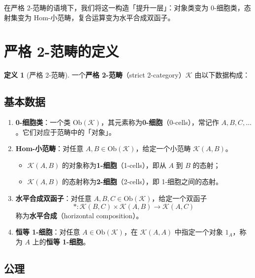 \documentclass[UTF8,a4paper,12pt]{ctexart}
\theoremstyle{definition}
\newtheorem{definition}{定义}[section]
\theoremstyle{plain}
\newcommand{\cat}[1]{\mathcal{#1}}
\newcommand{\Ob}{\mathrm{Ob}}
\begin{document}
在严格 2-范畴的语境下，我们将这一构造「提升一层」：对象类变为 0-细胞类，态射集变为 Hom-小范畴，复合运算变为水平合成双函子。

\section{严格 2-范畴的定义}

\begin{definition}[严格 2-范畴]
一个\textbf{严格 2-范畴}（strict 2-category）$\cat{K}$ 由以下数据构成：
\end{definition}

\subsection{基本数据}

\begin{enumerate}
  \item \textbf{0-细胞类}：一个类 $\Ob(\cat{K})$，其元素称为\textbf{0-细胞}（0-cells），常记作 $A, B, C, \dots$。它们对应于范畴中的「对象」。
  
  \item \textbf{Hom-小范畴}：对任意 $A, B \in \Ob(\cat{K})$，给定一个小范畴 $\cat{K}(A, B)$。
  \begin{itemize}
    \item $\cat{K}(A,B)$ 的对象称为\textbf{1-细胞}（1-cells），即从 $A$ 到 $B$ 的态射；
    \item $\cat{K}(A,B)$ 的态射称为\textbf{2-细胞}（2-cells），即 1-细胞之间的态射。
  \end{itemize}
  
  \item \textbf{水平合成双函子}：对任意 $A, B, C \in \Ob(\cat{K})$，给定一个双函子
  \[
  * : \cat{K}(B,C) \times \cat{K}(A,B) \longrightarrow \cat{K}(A,C)
  \]
  称为\textbf{水平合成}（horizontal composition）。
  
  \item \textbf{恒等 1-细胞}：对任意 $A \in \Ob(\cat{K})$，在 $\cat{K}(A,A)$ 中指定一个对象 $1_A$，称为 $A$ 上的\textbf{恒等 1-细胞}。
\end{enumerate}

\subsection{公理}
\end{document}
